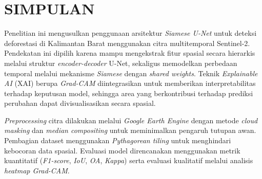 
\chapter{SIMPULAN}

Penelitian ini mengusulkan penggunaan arsitektur \textit{Siamese U-Net} untuk deteksi deforestasi di Kalimantan Barat menggunakan citra multitemporal Sentinel-2. Pendekatan ini dipilih karena mampu mengekstrak fitur spasial secara hierarkis melalui struktur \textit{encoder-decoder} U-Net, sekaligus memodelkan perbedaan temporal melalui mekanisme \textit{Siamese} dengan \textit{shared weights}. Teknik \textit{Explainable AI} (XAI) berupa \textit{Grad-CAM} diintegrasikan untuk memberikan interpretabilitas terhadap keputusan model, sehingga area yang berkontribusi terhadap prediksi perubahan dapat divisualisasikan secara spasial.

\textit{Preprocessing} citra dilakukan melalui \textit{Google Earth Engine} dengan metode \textit{cloud masking} dan \textit{median compositing} untuk meminimalkan pengaruh tutupan awan. Pembagian dataset menggunakan \textit{Pythagorean tiling} untuk menghindari kebocoran data spasial. Evaluasi model direncanakan menggunakan metrik kuantitatif (\textit{F1-score}, \textit{IoU}, \textit{OA}, \textit{Kappa}) serta evaluasi kualitatif melalui analisis \textit{heatmap Grad-CAM}.
